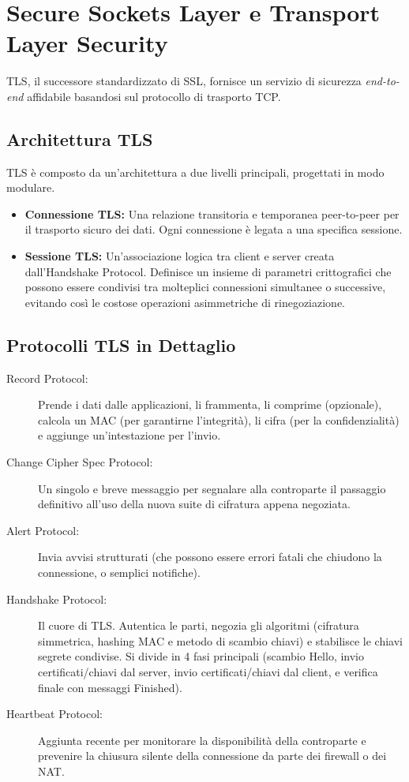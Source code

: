 \section{Secure Sockets Layer e Transport Layer Security}

TLS, il successore standardizzato di SSL, fornisce un servizio di sicurezza \textit{end-to-end} affidabile basandosi sul protocollo di trasporto TCP.

\subsection{Architettura TLS}
TLS è composto da un'architettura a due livelli principali, progettati in modo modulare.

\begin{defbox}
\begin{itemize}
    \item \textbf{Connessione TLS:} Una relazione transitoria e temporanea peer-to-peer per il trasporto sicuro dei dati. Ogni connessione è legata a una specifica sessione.
    \item \textbf{Sessione TLS:} Un'associazione logica tra client e server creata dall'Handshake Protocol. Definisce un insieme di parametri crittografici che possono essere condivisi tra molteplici connessioni simultanee o successive, evitando così le costose operazioni asimmetriche di rinegoziazione.
\end{itemize}
\end{defbox}

\subsection{Protocolli TLS in Dettaglio}
\begin{description}
    \item[Record Protocol:] Prende i dati dalle applicazioni, li frammenta, li comprime (opzionale), calcola un MAC (per garantirne l'integrità), li cifra (per la confidenzialità) e aggiunge un'intestazione per l'invio.
    \item[Change Cipher Spec Protocol:] Un singolo e breve messaggio per segnalare alla controparte il passaggio definitivo all'uso della nuova suite di cifratura appena negoziata.
    \item[Alert Protocol:] Invia avvisi strutturati (che possono essere errori fatali che chiudono la connessione, o semplici notifiche).
    \item[Handshake Protocol:] Il cuore di TLS. Autentica le parti, negozia gli algoritmi (cifratura simmetrica, hashing MAC e metodo di scambio chiavi) e stabilisce le chiavi segrete condivise. Si divide in 4 fasi principali (scambio Hello, invio certificati/chiavi dal server, invio certificati/chiavi dal client, e verifica finale con messaggi Finished).
    \item[Heartbeat Protocol:] Aggiunta recente per monitorare la disponibilità della controparte e prevenire la chiusura silente della connessione da parte dei firewall o dei NAT.
\end{description}
